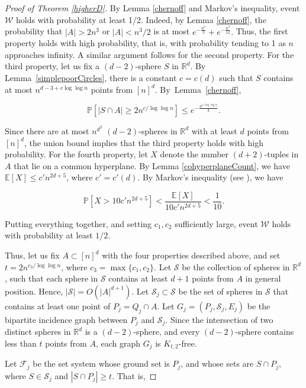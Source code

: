 \documentclass[11pt]{article}
\theoremstyle{plain}
\theoremstyle{definition}
\theoremstyle{remark}
\begin{document}
\begin{proof}[Proof of Theorem \ref{higherD}]
By Lemma \ref{chernoff} and Markov's inequality, event $\mathcal{W}$ holds with probability at least 1/2.   Indeed, by Lemma \ref{chernoff}, the probability that $|A| > 2n^3$ or $|A| < n^3/2$ is at most $e^{-\frac{n^3}{3}} + e^{-\frac{n^3}{12}}.$ Thus, the first property holds with high probability, that is, with probability tending to 1 as $n$ approaches infinity.  A similar argument follows for the second property.  For the third property, let us fix a $(d-2)$-sphere $S$ in $\mathbb{R}^d$.  By Lemma~\ref{simplepoorCircles}, there is a constant $c= c(d)$ such that $S$ contains at most $n^{d-3 + c\log\log n}$ points from $[n]^d$.  By~Lemma~\ref{chernoff}, 

$$\mathbb{P}[|S\cap A| \geq 2n^{c/\log\log n}] \leq  e^{-\frac{n^{c/\log\log n}}{3}}.$$

\noindent   Since there are at most $n^{d^2}$ $(d-2)$-spheres in $\mathbb{R}^d$ with at least $d$ points from $[n]^d$, the union bound implies that the third property holds with high probability.  For the fourth property, let $X$ denote the number $(d+2)$-tuples in $A$ that lie on a common hyperplane.  By Lemma \ref{cohyperplaneCount}, we have $\mathbb{E}[X] \leq c'n^{2d + 5}$, where $c' = c'(d)$. By Markov's inequality (see \cite{alon}), we have


$$\mathbb{P}[X> 10c'n^{2d + 5}] < \frac{\mathbb{E}[X]}{10c'n^{2d + 5}} < \frac{1}{10}.$$

 \noindent Putting everything together, and setting $c_1, c_2$ sufficiently large, event $\mathcal{W}$ holds with probability at least $1/2$.  
 
 
 
 
 
 
 Thus, let us fix $A\subset [n]^d$ with the four properties described above, and set $t = 2n^{c_3/\log\log n}$, where $c_3 = \max\{c_1,c_2\}$.  Let $\mathcal{S}$ be the collection of spheres in $\mathbb{R}^d$, such that each sphere in $\mathcal{S}$ contains at least $d+1$ points from $A$ in general position.  Hence, $|\mathcal{S}| = O(|A|^{d + 1})$. Let $\mathcal{S}_j \subset \mathcal{S}$ be the set of spheres in $\mathcal{S}$ that contains at least one point of $P_j  = Q_j\cap A$. Let $G_j = (P_j,\mathcal{S}_j,E_j)$ be the bipartite incidence graph between $P_j$ and $\mathcal{S}_j$.  Since the intersection of two distinct spheres in $\mathbb{R}^d$ is a $(d-2)$-sphere, and every $(d-2)$-sphere contains less than $t$ points from $A$, each graph $G_j$ is $K_{t,2}$-free. 


 Let $\mathcal{F}_{j}$ be the set system whose ground set is $P_{j}$, and whose sets are $S\cap P_{j}$, where $S \in \mathcal{S}_{j}$ and $|S\cap P_{j}| \geq t$.  That is, 



\end{proof}
\end{document}
